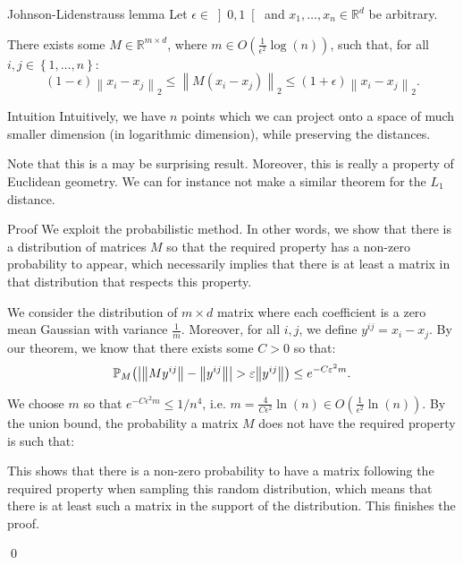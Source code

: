 \documentclass[a4paper]{article}
\begin{document}
\begin{parag}{Johnson-Lidenstrauss lemma}
    Let $\epsilon \in \left]0, 1\right[ $ and $x_1, \ldots, x_n \in \mathbb{R}^d$ be arbitrary.

    There exists some $M \in \mathbb{R}^{m \times d}$, where $m \in O\left(\frac{1}{\epsilon^2} \log\left(n\right)\right)$, such that, for all $i, j \in \left\{1, \ldots, n\right\}$: 
    \[\left(1 - \epsilon\right) \left\|x_i - x_j\right\|_2 \leq \left\|M\left(x_i - x_j\right)\right\|_2 \leq \left(1+\epsilon\right) \left\|x_i - x_j\right\|_2.\]
    
    \begin{subparag}{Intuition}
        Intuitively, we have $n$ points which we can project onto a space of much smaller dimension (in logarithmic dimension), while preserving the distances.

        Note that this is a may be surprising result. Moreover, this is really a property of Euclidean geometry. We can for instance not make a similar theorem for the $L_1$ distance.
    \end{subparag}

    \begin{subparag}{Proof}
        We exploit the probabilistic method. In other words, we show that there is a distribution of matrices $M$ so that the required property has a non-zero probability to appear, which necessarily implies that there is at least a matrix in that distribution that respects this property.

        We consider the distribution of $m \times d$ matrix where each coefficient is a zero mean Gaussian with variance $\frac{1}{m}$. Moreover, for all $i, j$, we define $y^{ij} = x_i - x_j$. By our theorem, we know that there exists some $C > 0$ so that: 
        \[\prob_M\left(\left|\left\|M y^{ij}\right\| - \left\|y^{ij}\right\|\right| > \epsilon \left\|y^{ij}\right\|\right) \leq e^{-C \epsilon^2 m}.\]
        
        We choose $m$ so that $e^{-C \epsilon^2 m} \leq 1/n^4$, i.e. $m = \frac{4}{C \epsilon^2} \ln\left(n\right) \in O\left(\frac{1}{\epsilon^2} \ln\left(n\right)\right)$. By the union bound, the probability a matrix $M$ does not have the required property is such that: 

        This shows that there is a non-zero probability to have a matrix following the required property when sampling this random distribution, which means that there is at least such a matrix in the support of the distribution. This finishes the proof.
        
        \qed
    \end{subparag}
\end{parag}
\end{document}
